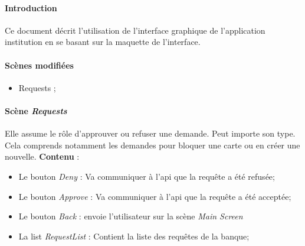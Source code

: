\documentclass{article}
\newcommand{\navbutton}[2]{Le bouton \emph{#1} : envoie l'utilisateur sur la scène \emph{#2}}
\newcommand{\content}[1]{\textbf{Contenu} : #1}
\begin{document}
\paragraph{Introduction}
\noindent
Ce document décrit l'utilisation de l'interface graphique de l'application institution en se basant sur la maquette de l'interface. \\

\paragraph{Scènes modifiées}
\begin{itemize}
\item Requests ;
\end{itemize}

\paragraph{Scène \emph{Requests}}
Elle assume le rôle d'approuver ou refuser une demande. Peut importe son type.
Cela comprends notamment les demandes pour bloquer une carte ou en créer une nouvelle.
\newline
\content{}
\begin{itemize}
    \item Le bouton \emph{Deny} : Va communiquer à l'api que la requête a été refusée;
    \item Le bouton \emph{Approve} : Va communiquer à l'api que la requête a été acceptée;
    \item \navbutton{Back}{Main Screen}
    \item La list \emph{RequestList} : Contient la liste des requêtes de la banque;
\end{itemize}
\end{document}
